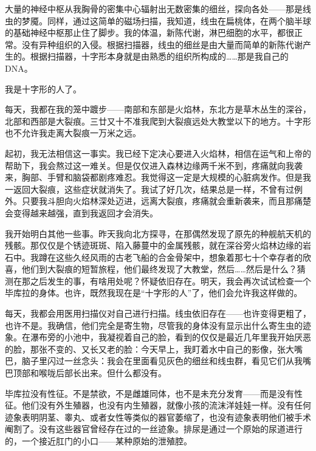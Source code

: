 \documentclass[AutoFakeBold=true]{book}
\begin{document}
大量的神经中枢从我胸骨的密集中心辐射出无数密集的细丝，探向各处——那是线虫的梦魇。同样，通过这简单的磁场扫描，我知道，线虫在扁桃体，在两个脑半球的基础神经中枢那止住了脚步。我的体温，新陈代谢，淋巴细胞的水平，都很正常。没有异种组织的入侵。根据扫描器，线虫的细丝是由大量而简单的新陈代谢产生的。根据扫描器，十字形本身就是由熟悉的组织所构成的……那是我自己的 DNA。

我是十字形的人了。

\vspace*{1em}{\kaishu 第一百一十六日：}

每天，我都在我的笼中踱步——南部和东部是火焰林，东北方是草木丛生的深谷，北部和西部是大裂痕。三廿又十不准我爬到大裂痕远处大教堂以下的地方。十字形也不允许我走离大裂痕一万米之远。

起初，我无法相信这一事实。我已经下定决心要进入火焰林，相信在运气和上帝的帮助下，我会熬过这一难关。但是仅仅进入森林边缘两千米不到，疼痛就向我袭来，胸部、手臂和脑袋都剧疼难忍。我觉得这一定是大规模的心脏病发作。但是我一返回大裂痕，这些症状就消失了。我试了好几次，结果总是一样，不曾有过例外。只要我斗胆向火焰林深处迈进，远离大裂痕，疼痛就会重新袭来，而且那痛楚会变得越来越强，直到我返回才会消失。

我开始明白其他一些事。昨天我向北方探寻，在那偶然发现了原先的种舰航天机的残骸。那仅仅是个锈迹斑斑、陷入藤蔓中的金属残骸，就在深谷旁火焰林边缘的岩石中。我蹲在这些久经风雨的古老飞船的合金骨架中，想象着那七十个幸存者的欣喜，他们到大裂痕的短暂旅程，他们最终发现了大教堂，然后……然后是什么？猜测在那之后发生的事，有啥用处呢？怀疑依旧存在。明天，我会再次试试检查一个毕库拉的身体。也许，既然我现在是``十字形的人''了，他们会允许我这样做的。

每天，我都会用医用扫描仪对自己进行扫描。线虫依旧存在——也许变得更粗了，也许不是。我确信，他们完全是寄生物，尽管我的身体没有显示出什么寄生虫的迹象。在瀑布旁的小池中，我凝视着自己的脸，看到的仅仅是最近几年里我开始厌恶的脸，那张不变的、又长又老的脸：今天早上，我盯着水中自己的影像，张大嘴巴，脑子里闪过一丝念头：我会在里面看见灰色的细丝和线虫群，看见它们从我嘴巴顶部和喉咙后部长出来。但什么都没有。

\vspace*{1em}{\kaishu 第一百一十七日：}

毕库拉没有性征。不是禁欲，不是雌雄同体，也不是未充分发育——而是没有性征。他们没有外生殖器，也没有内生殖器，就像小孩的流沫洋娃娃一样。没有任何迹象表明阴茎、睾丸、或者女性等类似的器官萎缩了，也没有迹象表明他们被手术阉割了。没有这些器官曾经存在过的一丝迹象。排尿是通过一个原始的尿道进行的，一个接近肛门的小口——某种原始的泄殖腔。
\end{document}
